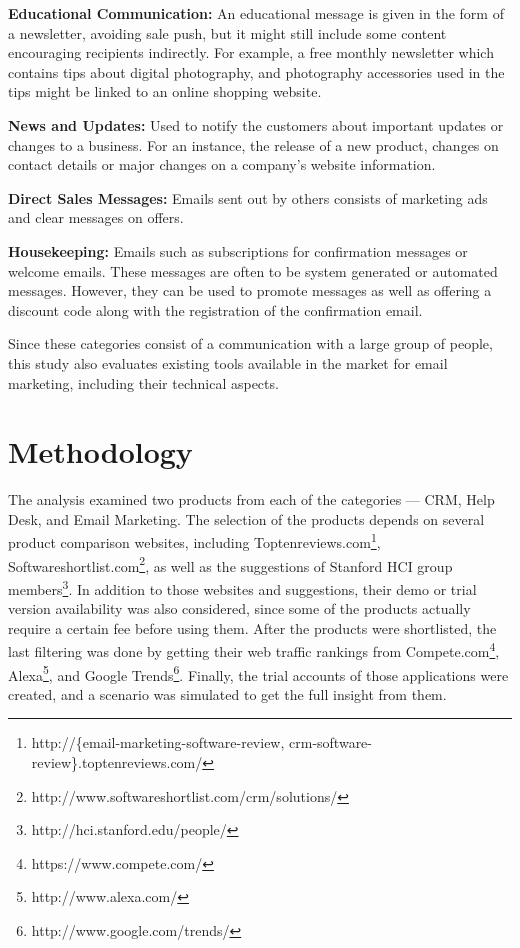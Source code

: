 \begin{compactitem}
	\item \textbf{Educational Communication:} An educational message is given in the form of a newsletter, avoiding sale push, but it might still include some content encouraging recipients indirectly. For example, a free monthly newsletter which contains tips about digital photography, and photography accessories used in the tips might be linked to an online shopping website. 
	\item \textbf{News and Updates:} Used to notify the customers about important updates or changes to a business. For an instance, the release of a new product, changes on contact details or major changes on a company's website information.
	\item \textbf{Direct Sales Messages:} Emails sent out by others consists of marketing ads and clear messages on offers.
	\item \textbf{Housekeeping:} Emails such as subscriptions for confirmation messages or welcome emails. These messages are often to be system generated or automated messages. However, they can be used to promote messages as well as offering a discount code along with the registration of the confirmation email.
\end{compactitem}

Since these categories consist of a communication with a large group of people, this study also evaluates existing tools available in the market for email marketing, including their technical aspects.

\section{Methodology}
\label{sec:3.2:Meth}

The analysis examined two products from each of the categories --- \ac{CRM}, Help Desk, and Email Marketing. The selection of the products depends on several product comparison websites, including Toptenreviews.com\footnote{http://\{email-marketing-software-review, crm-software-review\}.toptenreviews.com/ }, Softwareshortlist.com\footnote{http://www.softwareshortlist.com/crm/solutions/}, as well as the suggestions of Stanford HCI group members\footnote{http://hci.stanford.edu/people/}. In addition to those websites and suggestions, their demo or trial version availability was also considered, since some of the products actually require a certain fee before using them. After the products were shortlisted, the last filtering was done by getting their web traffic rankings from Compete.com\footnote{https://www.compete.com/}, Alexa\footnote{http://www.alexa.com/}, and Google Trends\footnote{http://www.google.com/trends/}. Finally, the trial accounts of those applications were created, and a scenario was simulated to get the full insight from them. 

